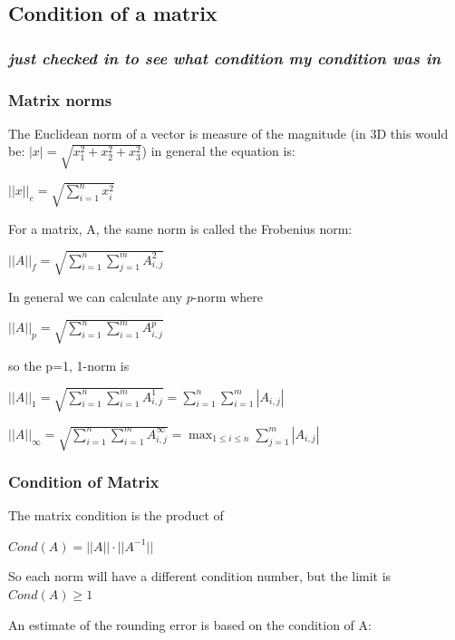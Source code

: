 \documentclass[11pt]{article}
\begin{document}
    \subsection{Condition of a matrix}\label{condition-of-a-matrix}

\subsubsection{\texorpdfstring{\emph{just checked in to see what
condition my condition was
in}}{just checked in to see what condition my condition was in}}\label{just-checked-in-to-see-what-condition-my-condition-was-in}

\subsubsection{Matrix norms}\label{matrix-norms}

The Euclidean norm of a vector is measure of the magnitude (in 3D this
would be: $|x|=\sqrt{x_{1}^{2}+x_{2}^{2}+x_{3}^{2}}$) in general the
equation is:

$||x||_{e}=\sqrt{\sum_{i=1}^{n}x_{i}^{2}}$

For a matrix, A, the same norm is called the Frobenius norm:

$||A||_{f}=\sqrt{\sum_{i=1}^{n}\sum_{j=1}^{m}A_{i,j}^{2}}$

In general we can calculate any $p$-norm where

$||A||_{p}=\sqrt{\sum_{i=1}^{n}\sum_{i=1}^{m}A_{i,j}^{p}}$

so the p=1, 1-norm is

$||A||_{1}=\sqrt{\sum_{i=1}^{n}\sum_{i=1}^{m}A_{i,j}^{1}}=\sum_{i=1}^{n}\sum_{i=1}^{m}|A_{i,j}|$

$||A||_{\infty}=\sqrt{\sum_{i=1}^{n}\sum_{i=1}^{m}A_{i,j}^{\infty}}=\max_{1\le i \le n}\sum_{j=1}^{m}|A_{i,j}|$

\subsubsection{Condition of Matrix}\label{condition-of-matrix}

The matrix condition is the product of

$Cond(A) = ||A||\cdot||A^{-1}||$

So each norm will have a different condition number, but the limit is
$Cond(A)\ge 1$

An estimate of the rounding error is based on the condition of A:
\end{document}
